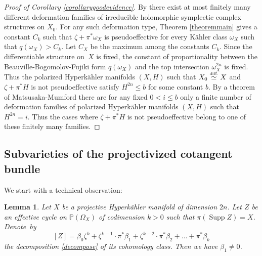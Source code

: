 \documentclass[JEP,XML,SOM,Unicode,NoEqCountersInSection,published]{cedram}
\theoremstyle{plain}
\newtheorem{lemma}[theorem]{Lemma}
\theoremstyle{definition}
\newcommand{\PP}{\ensuremath{\mathbb{P}}}
\DeclareMathOperator{\supp}{Supp}
\begin{document}
\begin{proof}[Proof of Corollary \ref{corollarygoodevidence}]
By \cite[Th.\,2.1]{Huy03b} there exist at most finitely many
different deformation families of irreducible holomorphic symplectic complex structures on $X_0$.
For any such deformation type, Theorem \ref{theoremmain} gives a constant $C_k$ such that $\zeta + \pi^* \omega_{X}$ is pseudoeffective for every Kähler class $\omega_X$ such that $q(\omega_{X})>C_k$. Let $C_X$ be the maximum among the constants $C_k$. Since the differentiable structure on~$X$ is fixed, the constant of proportionality between the Beauville-Bogomolov-Fujiki form $q(\omega_X)$ and the top intersection $\omega_X^{2n}$ is fixed.
Thus the polarized Hyperkähler manifolds $(X, H)$ such that
$X_0 \stackrel{\mbox{\tiny diff.}}{\simeq} X$ and $\zeta + \pi^* H$ is not pseudoeffective satisfy $H^{2n} \leq b$
for some constant $b$. By a theorem of Matsusaka-Mumford \cite{MM64}
there are for any fixed $0 < i\leq b$ only a finite number of deformation families
of polarized Hyperkähler manifolds $(X, H)$ such that $H^{2n}=i$.
Thus the cases where $\zeta + \pi^* H$ is not pseudoeffective belong to one of these finitely many families.
\end{proof}

\subsection{Subvarieties of the projectivized cotangent bundle} \label{subsectionsubvarieties}

We start with a technical observation:

\begin{lemma} \label{lemmakey}
Let $X$ be a projective Hyperkähler manifold of dimension $2n$.
Let $Z$ be an effective cycle on $\PP(\Omega_X)$
of codimension $k\!>\!0$ such that $\pi(\supp Z)\!=\! X$. Denote~by
\[
[Z]= \beta_0 \zeta^k + \zeta^{k-1}\cdot \pi^* \beta_1 + \zeta^{k-2}\cdot \pi^* \beta_2 + \ldots + \pi^* \beta_k
\]
the decomposition \eqref{decompose} of its cohomology class. Then we have $\beta_1 \neq 0$.
\end{lemma}
\end{document}
